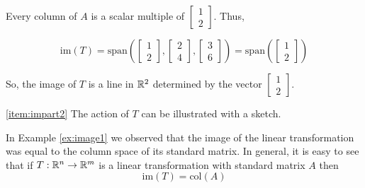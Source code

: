 \documentclass{ximera}
\begin{document}
\begin{example}
\begin{explanation}
Every column of $A$ is a scalar multiple of $\begin{bmatrix}1\\2\end{bmatrix}$.  Thus,

$$\mbox{im}(T)=\mbox{span}\left(\begin{bmatrix}1\\2\end{bmatrix}, \begin{bmatrix}2\\4\end{bmatrix}, \begin{bmatrix}3\\6\end{bmatrix}\right)=\mbox{span}\left(\begin{bmatrix}1\\2\end{bmatrix}\right)$$

So, the image of $T$ is a line in $\mathbb{R}^2$ determined by the vector $\begin{bmatrix}1\\2\end{bmatrix}$.

\ref{item:impart2} The action of $T$ can be illustrated with a sketch.

\begin{image}
\centering
{}

\end{image}


\end{explanation}
\end{example}


In Example \ref{ex:image1} we observed that the image of the linear transformation was equal to the column space of its standard matrix.  In general, it is easy to see that if $T:\mathbb{R}^n\rightarrow \mathbb{R}^m$ is a linear transformation with standard matrix $A$ then
$$\mbox{im}(T)=\mbox{col}(A)$$
\end{document}

